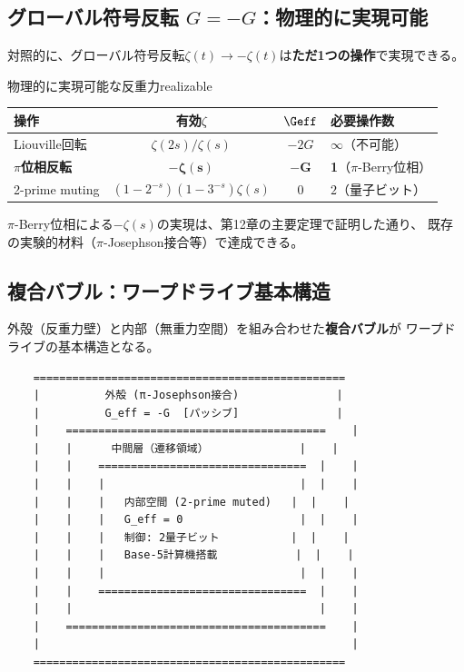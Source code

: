 \subsection{グローバル符号反転 $G = -G$：物理的に実現可能}
\label{sec:13.3}

対照的に、グローバル符号反転$\zeta(t) \to -\zeta(t)$は\textbf{ただ1つの操作}で実現できる。

\begin{keyresult}{物理的に実現可能な反重力}{realizable}
\begin{center}
\begin{tabular}{lccl}
\toprule
\textbf{操作} & \textbf{有効$\zeta$} & \textbf{$\Geff$} & \textbf{必要操作数} \\
\midrule
Liouville回転 & $\zeta(2s)/\zeta(s)$ & $-2G$ & $\infty$（不可能） \\
\textbf{$\pi$位相反転} & $\mathbf{-\zeta(s)}$ & $\mathbf{-G}$ & \textbf{1}（$\pi$-Berry位相） \\
2-prime muting & $(1\!-\!2^{-s})(1\!-\!3^{-s})\zeta(s)$ & $0$ & $2$（量子ビット） \\
\bottomrule
\end{tabular}
\end{center}
$\pi$-Berry位相による$-\zeta(s)$の実現は、第12章の主要定理で証明した通り、
既存の実験的材料（$\pi$-Josephson接合等）で達成できる。
\end{keyresult}


\subsection{複合バブル：ワープドライブ基本構造}
\label{sec:13.4}

外殻（反重力壁）と内部（無重力空間）を組み合わせた\textbf{複合バブル}が
ワープドライブの基本構造となる。

\begin{tcolorbox}[colback=gray!5!white, colframe=gray!70!black, title=複合バブル構造（断面図）]
\begin{verbatim}
    ================================================
    |          外殻 (π-Josephson接合)               |
    |          G_eff = -G  [パッシブ]               |
    |    ========================================    |
    |    |      中間層（遷移領域）              |    |
    |    |    ================================  |    |
    |    |    |                              |  |    |
    |    |    |   内部空間 (2-prime muted)   |  |    |
    |    |    |   G_eff = 0                  |  |    |
    |    |    |   制御: 2量子ビット           |  |    |
    |    |    |   Base-5計算機搭載            |  |    |
    |    |    |                              |  |    |
    |    |    ================================  |    |
    |    |                                      |    |
    |    ========================================    |
    |                                                |
    ================================================
\end{verbatim}
\end{tcolorbox}

